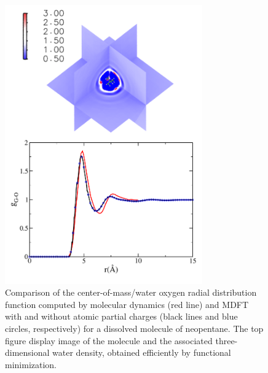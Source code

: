 \documentclass[aip,jcp,preprint]{revtex4-1}
\begin{document}
\begin{figure}
    \includegraphics[width=8.5cm]{neopentane_g_and_dens.pdf}
    \caption{
        \label{fig:gr_cyclohexane_neopentane}
        Comparison of the center-of-mass/water oxygen radial distribution function computed by molecular dynamics (red line) and MDFT
        with and without atomic partial charges (black lines and blue circles, respectively) for a dissolved molecule of neopentane. The top figure display image of the molecule and the associated three-dimensional water density, obtained efficiently by functional minimization.
        }
\end{figure}
\end{document}
